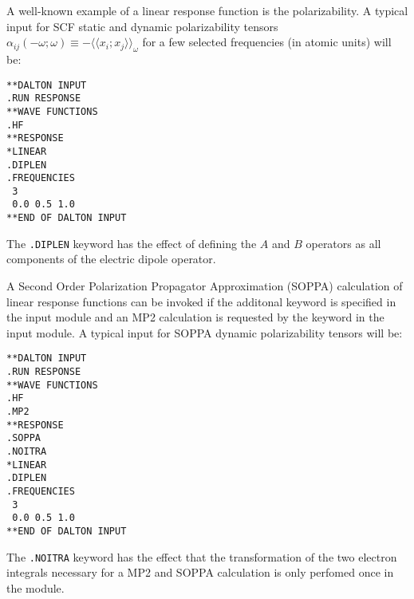 \begin{center}
\end{center}

A well-known example of a linear response
function is the polarizability.
A typical input for SCF static and dynamic polarizability tensors
$\alpha_{ij}(-\omega;\omega)\equiv-\langle\!\langle
x_i;x_j\rangle\!\rangle_\omega$ for a few selected frequencies (in
atomic units) will be:
\begin{verbatim}
**DALTON INPUT
.RUN RESPONSE
**WAVE FUNCTIONS
.HF
**RESPONSE
*LINEAR
.DIPLEN
.FREQUENCIES
 3
 0.0 0.5 1.0
**END OF DALTON INPUT
\end{verbatim}
The {\tt .DIPLEN} keyword has the effect of defining the $A$ and $B$
operators as all components of the electric dipole operator.

A Second Order Polarization Propagator Approximation
(SOPPA)\cite{esnpjjodjcp73,jopjdycpr2,mjpekdtehjajjojcp}
calculation of linear response functions
can be invoked if the additonal keyword  is specified in the 
 input module and an MP2 calculation is requested by the 
keyword  in the  input module.  A typical input 
for SOPPA dynamic polarizability tensors  will be:
\begin{verbatim}
**DALTON INPUT
.RUN RESPONSE
**WAVE FUNCTIONS
.HF
.MP2
**RESPONSE
.SOPPA
.NOITRA
*LINEAR
.DIPLEN
.FREQUENCIES
 3
 0.0 0.5 1.0
**END OF DALTON INPUT
\end{verbatim}
The {\tt .NOITRA} keyword has the effect that the transformation of the two 
electron integrals necessary for a MP2 and SOPPA calculation is only perfomed
once in the  module.

